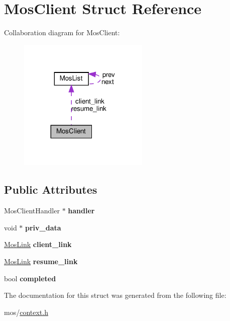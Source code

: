 \hypertarget{structMosClient}{}\section{Mos\+Client Struct Reference}
\label{structMosClient}


Collaboration diagram for Mos\+Client\+:\nopagebreak
\begin{figure}[H]
\begin{center}
\leavevmode
\includegraphics[width=176pt]{structMosClient__coll__graph}
\end{center}
\end{figure}
\subsection*{Public Attributes}
\begin{DoxyCompactItemize}
\item 
\mbox{\label{structMosClient_afded4ff09a6d3a3d583cfa9e6ec85819}} 
Mos\+Client\+Handler $\ast$ {\bfseries handler}
\item 
\mbox{\label{structMosClient_acd4c3f64b0550d3c7af5ecb37adcbe66}} 
void $\ast$ {\bfseries priv\+\_\+data}
\item 
\mbox{\label{structMosClient_a254ff0a6149f4e4548d75dde37f2db1c}} 
\hyperlink{structMosList}{Mos\+Link} {\bfseries client\+\_\+link}
\item 
\mbox{\label{structMosClient_a227da9bb9f58de9673cfb34126f190e9}} 
\hyperlink{structMosList}{Mos\+Link} {\bfseries resume\+\_\+link}
\item 
\mbox{\label{structMosClient_a7c79c3eb94a4b5e855791dafd9426b71}} 
bool {\bfseries completed}
\end{DoxyCompactItemize}


The documentation for this struct was generated from the following file\+:\begin{DoxyCompactItemize}
\item 
mos/\hyperlink{context_8h}{context.\+h}\end{DoxyCompactItemize}
